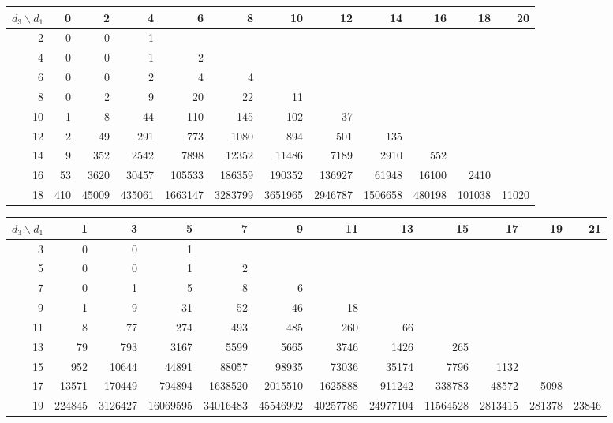 \begin{tabular}{r|rrrrrrrrrrr}
\hline
$d_3 \backslash d_1$ & 0 & 2 & 4 & 6 & 8 & 10 & 12 & 14 & 16 & 18 & 20 \\
\hline
2 & 0 & 0 & 1 &  &  &  &  &  &  &  &  \\
4 & 0 & 0 & 1 & 2 &  &  &  &  &  &  &  \\
6 & 0 & 0 & 2 & 4 & 4 &  &  &  &  &  &  \\
8 & 0 & 2 & 9 & 20 & 22 & 11 &  &  &  &  &  \\
10 & 1 & 8 & 44 & 110 & 145 & 102 & 37 &  &  &  &  \\
12 & 2 & 49 & 291 & 773 & 1080 & 894 & 501 & 135 &  &  &  \\
14 & 9 & 352 & 2542 & 7898 & 12352 & 11486 & 7189 & 2910 & 552 &  &  \\
16 & 53 & 3620 & 30457 & 105533 & 186359 & 190352 & 136927 & 61948 & 16100 & 2410 &  \\
18 & 410 & 45009 & 435061 & 1663147 & 3283799 & 3651965 & 2946787 & 1506658 & 480198 & 101038 & 11020 \\
\hline
\end{tabular}

\begin{tabular}{r|rrrrrrrrrrr}
\hline
$d_3 \backslash d_1$ & 1 & 3 & 5 & 7 & 9 & 11 & 13 & 15 & 17 & 19 & 21 \\
\hline
3 & 0 & 0 & 1 &  &  &  &  &  &  &  &  \\
5 & 0 & 0 & 1 & 2 &  &  &  &  &  &  &  \\
7 & 0 & 1 & 5 & 8 & 6 &  &  &  &  &  &  \\
9 & 1 & 9 & 31 & 52 & 46 & 18 &  &  &  &  &  \\
11 & 8 & 77 & 274 & 493 & 485 & 260 & 66 &  &  &  &  \\
13 & 79 & 793 & 3167 & 5599 & 5665 & 3746 & 1426 & 265 &  &  &  \\
15 & 952 & 10644 & 44891 & 88057 & 98935 & 73036 & 35174 & 7796 & 1132 &  &  \\
17 & 13571 & 170449 & 794894 & 1638520 & 2015510 & 1625888 & 911242 & 338783 & 48572 & 5098 &  \\
19 & 224845 & 3126427 & 16069595 & 34016483 & 45546992 & 40257785 & 24977104 & 11564528 & 2813415 & 281378 & 23846 \\
\hline
\end{tabular}

